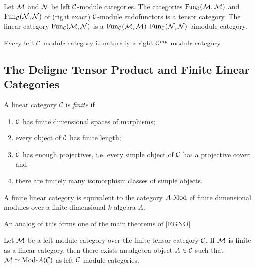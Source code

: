 \documentclass{amsart}
\begin{document}
\begin{example}
	Let $\mathcal M$ and $\mathcal N$ be left $\mathcal C$-module categories. The categories $\operatorname{Fun}_{\mathcal C}(\mathcal M, \mathcal M)$ and $\operatorname{Fun}_{\mathcal C}(\mathcal N, \mathcal N)$ of (right exact) $\mathcal C$-module endofunctors is a tensor category. The linear category $\operatorname{Fun}_{\mathcal C}(\mathcal M, \mathcal N)$ is a $\operatorname{Fun}_{\mathcal C}(\mathcal M, \mathcal M)$-$\operatorname{Fun}_{\mathcal C}(\mathcal N, \mathcal N)$-bimodule category. 
\end{example}

\begin{remark}
 	Every left $\mathcal C$-module category is naturally a right $\mathcal C^{mp}$-module category. 
\end{remark}




\subsection{The Deligne Tensor Product and Finite Linear Categories}

\begin{definition} %
	A linear category $\mathcal C$ is {\em finite} if 
	\begin{enumerate}
		\item $\mathcal C$ has finite dimensional spaces of morphisms;
		\item every object of $\mathcal C$ has finite length;
		\item $\mathcal C$ has enough projectives, i.e. every simple object of $\mathcal C$ has a projective cover; and
		\item there are finitely many isomorphism classes of simple objects.  
	\end{enumerate}
\end{definition}

\begin{remark}
	 A finite linear category is equivalent to the category $\Mod{A}{}$ of finite dimensional modules over a finite dimensional $k$-algebra $A$.
\end{remark}

An analog of this forms one of the main theorems of [EGNO]. 

\begin{theorem}[EGNO 2.11.6(i)] \label{thm:EGNO2.11.6}
	Let $\mathcal M$ be a left module category over the finite tensor category $\mathcal C$. If $\mathcal M$ is finite as a linear category, then there exists an algebra object $A \in \mathcal C$ such that $\cM \simeq \Mod{}{A} (\cC)$ as left $\mathcal C$-module categories. 
\end{theorem}
\end{document}

